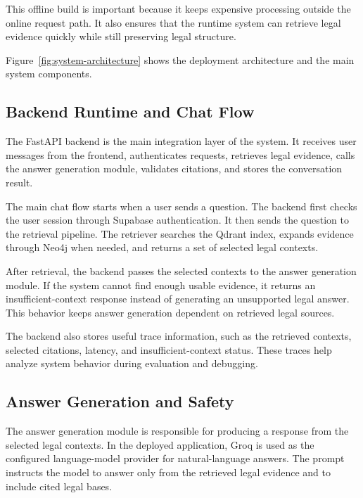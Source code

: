 This offline build is important because it keeps expensive processing outside the online request path. It also ensures that the runtime system can retrieve legal evidence quickly while still preserving legal structure.

Figure~\ref{fig:system-architecture} shows the deployment architecture and the main system components.


\subsection{Backend Runtime and Chat Flow}

The FastAPI backend is the main integration layer of the system. It receives user messages from the frontend, authenticates requests, retrieves legal evidence, calls the answer generation module, validates citations, and stores the conversation result.

The main chat flow starts when a user sends a question. The backend first checks the user session through Supabase authentication. It then sends the question to the retrieval pipeline. The retriever searches the Qdrant index, expands evidence through Neo4j when needed, and returns a set of selected legal contexts.

After retrieval, the backend passes the selected contexts to the answer generation module. If the system cannot find enough usable evidence, it returns an insufficient-context response instead of generating an unsupported legal answer. This behavior keeps answer generation dependent on retrieved legal sources.

The backend also stores useful trace information, such as the retrieved contexts, selected citations, latency, and insufficient-context status. These traces help analyze system behavior during evaluation and debugging.

\subsection{Answer Generation and Safety}

The answer generation module is responsible for producing a response from the selected legal contexts. In the deployed application, Groq is used as the configured language-model provider for natural-language answers. The prompt instructs the model to answer only from the retrieved legal evidence and to include cited legal bases.

